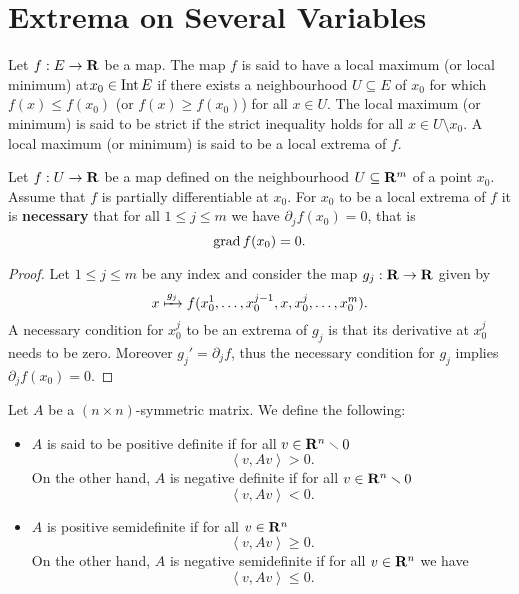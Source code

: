 \section{Extrema on Several Variables}

\begin{definition}
    \label{def:extrema-points}
    Let \(f: E \to \mathbf{R}\) be a map. The map \(f\) is said to have a local maximum (or
    local minimum) at\(x_0 \in \operatorname{Int} E\) if there exists a neighbourhood \(U \subseteq E\) of
    \(x_0\) for which \(f(x) \leq f(x_0)\) (or \(f(x) \geq f(x_0)\)) for all \(x \in
    U\). The local maximum (or minimum) is said to be strict if the strict
    inequality holds for all \(x \in U \setminus x_0\). A local maximum (or minimum) is said
    to be a local extrema of \(f\).
\end{definition}

\begin{theorem}
    \label{thm:local-extrema-necessary-condition}
    Let \(f: U \to \mathbf{R}\) be a map defined on the neighbourhood \(U \subseteq \mathbf{R}^{m}\) of a
    point \(x_0\). Assume that \(f\) is partially differentiable at \(x_0\). For
    \(x_0\) to be a local extrema of \(f\) it is \textbf{necessary} that for all
    \(1 \leq j \leq m\) we have \(\partial_jf(x_0) = 0\), that is
    \[
        \operatorname{grad} f(x_0) = 0.
    \]
\end{theorem}

\begin{proof}
    Let \(1 \leq j \leq m\) be any index and consider the map \(g_{j}: \mathbf{R} \to \mathbf{R}\) given
    by
    \[
        x \xmapsto{g_j} f(x_0^1, \dots, x_0^{j-1}, x, x_0^j, \dots, x_0^m).
    \]
    A necessary condition for \(x_0^j\) to be an extrema of \(g_j\) is that its
    derivative at \(x_0^j\) needs to be zero. Moreover \(g_j' = \partial_{j} f\), thus
    the necessary condition for \(g_j\) implies \(\partial_jf(x_0) = 0\).
\end{proof}

\begin{definition}
    \label{def:symmetric-matrix-definiteness}
    Let \(A\) be a \((n \times n)\)-symmetric matrix. We define the following:
    \begin{itemize}\setlength\itemsep{0em}
        \item \(A\) is said to be positive definite if for all \(v \in \mathbf{R}^n \smallsetminus 0\)
              \[
                  \left\langle v, Av \right\rangle > 0.
              \]
              On the other hand, \(A\) is negative definite if for all \(v \in \mathbf{R}^n \smallsetminus 0\)
              \[
                  \left\langle v, Av \right\rangle < 0.
              \]
        \item \(A\) is positive semidefinite if for all \(v \in \mathbf{R}^n\)
              \[
                  \left\langle v, Av \right\rangle \geq 0.
              \]
              On the other hand, \(A\) is negative semidefinite if for all \(v \in \mathbf{R}^n\) we
              have
              \[
                  \left\langle v, Av \right\rangle \leq 0.
              \]
    \end{itemize}
\end{definition}

